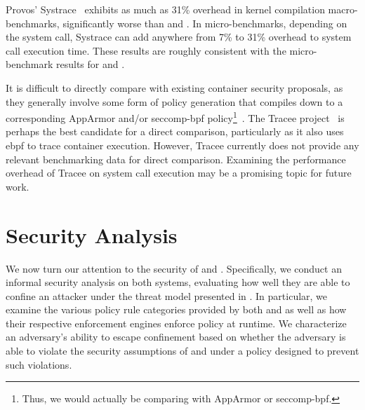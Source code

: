 Provos' Systrace~\cite{provos2003_systrace} exhibits as much as 31\% overhead in kernel
compilation macro-benchmarks, significantly worse than \bpfbox{} and \bpfcontain{}. In
micro-benchmarks, depending on the system call, Systrace can add anywhere from 7\% to 31\%
overhead to system call execution time. These results are roughly consistent with the
micro-benchmark results for \bpfbox{} and \bpfcontain{}.

It is difficult to directly compare \bpfcontain{} with existing container security
proposals, as they generally involve some form of policy generation that compiles down to
a corresponding AppArmor and/or seccomp-bpf policy\footnote{Thus, we would actually be
comparing \bpfcontain{} with AppArmor or seccomp-bpf.}~\cite{ghavamania2020_confine,
loukidis2018_dockersec, lei2017_speaker}. The Tracee project~\cite{tracee} is perhaps the
best candidate for a direct comparison, particularly as it also uses \gls{ebpf} to trace
container execution. However, Tracee currently does not provide any relevant benchmarking
data for direct comparison. Examining the performance overhead of Tracee on system call
execution may be a promising topic for future work.

\section{Security Analysis}%
\label{s:eval-security}

We now turn our attention to the security of \bpfbox{} and \bpfcontain. Specifically, we
conduct an informal security analysis on both systems, evaluating how well they are able
to confine an attacker under the threat model presented in . In
particular, we examine the various policy rule categories provided by both \bpfbox{} and
\bpfcontain{} as well as how their respective enforcement engines enforce policy at
runtime. We characterize an adversary's ability to escape confinement based on whether the
adversary is able to violate the security assumptions of \bpfbox{} and \bpfcontain{} under
a policy designed to prevent such violations.


